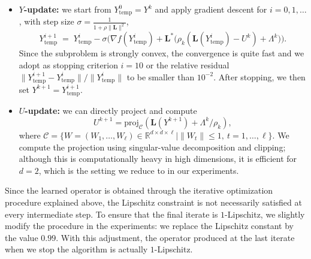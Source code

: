 \documentclass[onefignum,onetabnum]{siamonline250211}
\newcommand{\R}{\mathbb{R}}
\begin{document}
\begin{itemize}
    \item \textbf{$Y$-update:} we start from $Y^{0}_{\text{temp}}=Y^k$ and apply gradient descent for $i=0,1,\dots$, with step size 
    $\sigma = \tfrac{1}{1+\rho\|\mathbf{L}\|^2}$, 
    \[
        Y_{\text{temp}}^{i+1} \;=\; Y_{\text{temp}}^{i} - \sigma \Big( \nabla f(Y_{\text{temp}}^{i}) 
            + \mathbf{L}^*\!\big( \rho_k(\mathbf{L}(Y_{\text{temp}}^{i}) - U^k) + \Lambda^k \big) \Big).
    \]
    Since the subproblem is strongly convex, the convergence is quite fast and we adopt as stopping criterion $i = 10$ or the relative residual $\|Y_{\text{temp}}^{i+1}-Y_{\text{temp}}^i\|/\|Y_{\text{temp}}^i\|$ to be smaller than $10^{-2}$. After stopping, we then set $Y^{k+1} = Y_{\text{temp}}^{i+1}$.
    
    \item \textbf{$U$-update:} we can directly project and compute
    \[
        U^{k+1} = \mathrm{proj}_{\mathcal{C}}( \mathbf{L}(Y^{k+1}) + \Lambda^k/\rho_k ),
    \]
    where $\mathcal{C}=\{W = (W_1,\dots,W_\ell) \in \R^{d\times d \times \ell} \mid \|W_t\|\leq 1, \ t = 1,\dots,\ell\}$. We compute the projection using singular-value decomposition and clipping; although this is computationally heavy in high dimensions, it is efficient for $d=2$, which is the setting we reduce to in our experiments.
\end{itemize}

\begin{remark}
Since the learned operator is obtained through the iterative optimization procedure explained above, the Lipschitz constraint is not necessarily satisfied at every intermediate step. To ensure that the final iterate is $1$-Lipschitz, we slightly modify the procedure in the experiments: we replace the Lipschitz constant by the value $0.99$. With this adjustment, the operator produced at the last iterate when we stop the algorithm is actually $1$-Lipschitz.
\end{remark}
\end{document}
